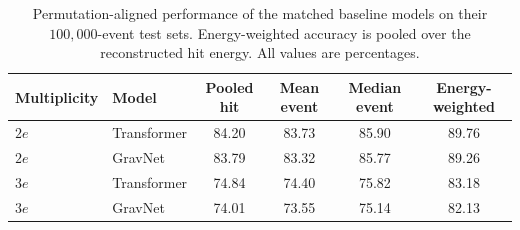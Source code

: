 \begin{table}[htbp]
    \centering
    \small
    \setlength{\tabcolsep}{5pt}
    \caption{Permutation-aligned performance of the matched baseline models
    on their \(100{,}000\)-event test sets. Energy-weighted accuracy is pooled
    over the reconstructed hit energy. All values are percentages.}
    \label{tab:results_baseline_performance}
    \begin{tabular}{llcccc}
        \hline
        Multiplicity & Model & Pooled hit & Mean event & Median event & Energy-weighted \\
        \hline
        \(2e\) & Transformer & 84.20 & 83.73 & 85.90 & 89.76 \\
        \(2e\) & GravNet & 83.79 & 83.32 & 85.77 & 89.26 \\
        \(3e\) & Transformer & 74.84 & 74.40 & 75.82 & 83.18 \\
        \(3e\) & GravNet & 74.01 & 73.55 & 75.14 & 82.13 \\
        \hline
    \end{tabular}
\end{table}
